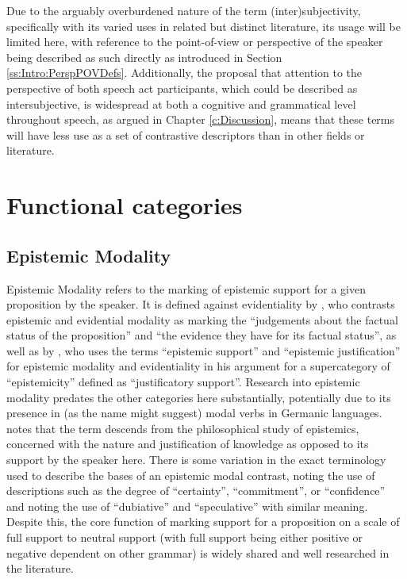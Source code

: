 Due to the arguably overburdened nature of the term (inter)subjectivity, specifically with its varied uses in related but distinct literature, its usage will be limited here, with reference to the point-of-view or perspective of the speaker being described as such directly as introduced in Section \ref{ss:Intro:PerspPOVDefs}. Additionally, the proposal that attention to the perspective of both speech act participants, which could be described as intersubjective, is widespread at both a cognitive and grammatical level throughout speech, as argued in Chapter \ref{c:Discussion}, means that these terms will have less use as a set of contrastive descriptors than in other fields or literature.

\section{Functional categories}\label{s:Intro:Categories}
\subsection{Epistemic Modality}
Epistemic Modality refers to the marking of epistemic support for a given proposition by the speaker. It is defined against evidentiality by , who contrasts epistemic and evidential modality as marking the ``judgements about the factual status of the proposition'' and ``the evidence they have for its factual status'', as well as by , who uses the terms ``epistemic support'' and ``epistemic justification'' for epistemic modality and evidentiality in his argument for a supercategory of ``epistemicity'' defined as ``justificatory support''. Research into epistemic modality predates the other categories here substantially, potentially due to its presence in (as the name might suggest) modal verbs in Germanic languages.  notes that the term descends from the philosophical study of epistemics, concerned with the nature and justification of knowledge as opposed to its support by the speaker here. There is some variation in the exact terminology used to describe the bases of an epistemic modal contrast,  noting the use of descriptions such as the degree of ``certainty'', ``commitment'', or ``confidence'' and  noting the use of ``dubiative'' and ``speculative'' with similar meaning. Despite this, the core function of marking support for a proposition on a scale of full support to neutral support (with full support being either positive or negative dependent on other grammar) is widely shared and well researched in the literature.


